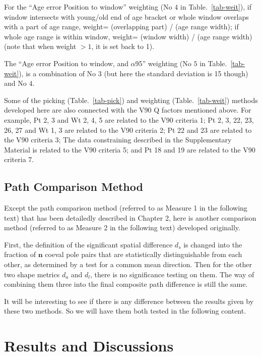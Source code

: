 For the ``Age error Position to window'' weighting (No $4$ in
Table.~\ref{tab-weit}), if window intersects with young/old end of age bracket
or whole window overlaps with a part of age range, weight= (overlapping part)
/ (age range width); if whole age range is within window, weight= (window width)
/ (age range width) (note that when weight $>1$, it is set back to 1).

The ``Age error Position to window, and $\alpha$95'' weighting (No $5$ in
Table.~\ref{tab-weit}), is a combination of No $3$ (but here the standard
deviation is 15 though) and No $4$.

Some of the picking (Table.~\ref{tab-pick}) and weighting
(Table.~\ref{tab-weit}) methods developed here are also connected with the V90 Q
factors mentioned above. For example, Pt 2, 3 and Wt 2, 4, 5 are related to the
V90 criteria 1; Pt 2, 3, 22, 23, 26, 27 and Wt 1, 3 are related to the V90
criteria 2; Pt 22 and 23 are related to the V90 criteria 3; The data
constraining described in the Supplementary Material is related to the V90
criteria 5; and Pt 18 and 19 are related to the V90 criteria 7.

\subsection{Path Comparison Method}

Except the path comparison method (referred to as Measure 1 in the following
text) that has been detailedly described in Chapter 2, here is another
comparison method (referred to as Measure 2 in the following text) developed
originally.

First, the definition of the significant spatial difference $d_s$ is changed
into the fraction of $\mathbf{n}$ coeval pole pairs that are statistically
distinguishable from each other, as determined by a test for a common mean
direction. Then for the other two shape metrics $d_a$ and $d_l$, there is no
significance testing on them. The way of combining them three into the final
composite path difference is still the same.

It will be interesting to see if there is any difference between the results
given by these two methods. So we will have them both tested in the following
content.

\section{Results and Discussions}

